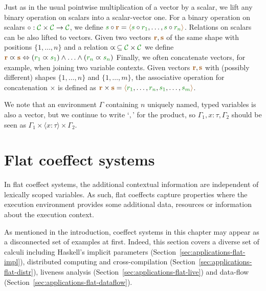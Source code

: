 Just as in the usual pointwise multiplication of a vector by a scalar, we lift any binary operation on scalars into a
scalar-vector one. For a binary operation on scalars $\circ : \C \times \C \rightarrow \C$, we define
 $\cclrd{s} \circ \aclrd{\textbf{r}} = \alift{ \cclrd{s}\circ\cclrd{r_1}, \ldots, \cclrd{s}\circ\cclrd{r_n}}$.
Relations on scalars can be also lifted to vectors. Given two vectors $\aclrd{\textbf{r}}, \aclrd{\textbf{s}}$ of the
same shape with positions $\{ 1, \ldots, n \}$ and a relation $\varpropto\, \subseteq \C \times \C$ we define
$\aclrd{\textbf{r}} \varpropto \aclrd{\textbf{s}} \Leftrightarrow (\cclrd{r_1} \varpropto \cclrd{s_1}) \wedge \ldots \wedge (\cclrd{r_n} \varpropto \cclrd{s_n}) $
Finally, we often concatenate vectors, for example, when joining two variable contexts.
Given vectors $\aclrd{\textbf{r}}, \aclrd{\textbf{s}}$ with (possibly different) shapes $\{ 1, \ldots, n \}$ and
$\{ 1, \ldots, m \}$, the associative operation for concatenation $\times$ is defined as
$\aclrd{\textbf{r}}\times\aclrd{\textbf{s}} = \alift{\cclrd{r_1},\ldots,\cclrd{r_n},\cclrd{s_1},\ldots,\cclrd{s_m}}$.

We note that an environment $\Gamma$ containing $n$ uniquely named, typed variables is also a vector,
but we continue to write `$,$' for the product, so $\Gamma_1, x\!:\!\tau, \Gamma_2$ should
be seen as $\Gamma_1 \times \langle x\!:\!\tau\rangle \times \Gamma_2$.




%
%

\section{Flat coeffect systems}
\label{sec:applications-flat}

In flat coeffect systems, the additional contextual information are independent of lexically scoped
variables. As such, flat coeffects capture properties where the execution environment provides some
additional data, resources or information about the execution context.

As mentioned in the introduction, coeffect systems in this chapter may appear as a disconnected
set of examples at first. Indeed, this section covers a diverse set of calculi including
Haskell's implicit parameters (Section~\ref{sec:applications-flat-impl}), distributed computing and
cross-compilation (Section~\ref{sec:applications-flat-distr}), liveness analysis
(Section~\ref{sec:applications-flat-live}) and data-flow (Section~\ref{sec:applications-flat-dataflow}).

